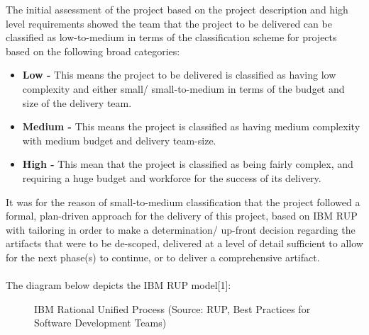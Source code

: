 \documentclass[12pt]{article} %
\begin{document}
	The initial assessment of the project based on the project description and high level requirements showed the team that the project to be delivered can be classified as low-to-medium in terms of the classification scheme for projects based on the following broad categories:
	\begin{itemize}
		\item \textbf{Low -} This means the project to be delivered is classified as having low complexity and either small/ small-to-medium in terms of the budget and size of the delivery team.
		\item \textbf{Medium -} This means the project is classified as having medium complexity with medium budget and delivery team-size.
		\item \textbf{High -} This mean that the project is classified as being fairly complex, and requiring a huge budget and workforce for the success of its delivery.
	\end{itemize}
	
	It was for the reason of small-to-medium classification that the project followed a formal, plan-driven approach for the delivery of this project, based on IBM RUP with tailoring in order to make a determination/ up-front decision regarding the artifacts that were to be de-scoped, delivered at a level of detail sufficient to allow for the next phase(s) to continue, or to deliver a comprehensive artifact.
	\\
	\\
	The diagram below depicts the IBM RUP model[1]:
	
		\begin{figure}[H] %
			\caption{IBM Rational Unified Process (Source: RUP, Best Practices for Software Development Teams)}
			\label{fig:speciation}
		\end{figure}
	
\end{document}

